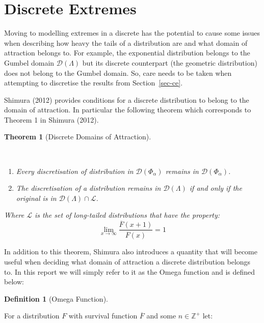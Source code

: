 \documentclass[
  10pt,
  a4paper,
]{scrreprt}
\providecommand{\tightlist}{%
  \setlength{\itemsep}{0pt}\setlength{\parskip}{0pt}}\usepackage{longtable,booktabs,array}
\theoremstyle{plain}
\newtheorem{theorem}{Theorem}[section]
\theoremstyle{definition}
\newtheorem{definition}{Definition}[section]
\theoremstyle{remark}
\begin{document}
{\hypertarget{discrete-extremes}{%
\section{Discrete Extremes}\label{discrete-extremes}}

Moving to modelling extremes in a discrete has the potential to cause
some issues when describing how heavy the tails of a distribution are
and what domain of attraction belongs to. For example, the exponential
distribution belongs to the Gumbel domain \(\mathcal D(\Lambda)\) but
its discrete counterpart (the geometric distribution) does not belong to
the Gumbel domain. So, care needs to be taken when attempting to
discretise the results from Section~\ref{sec-ce}.

Shimura (2012) provides conditions for a discrete distribution to belong
to the domain of attraction. In particular the following theorem which
corresponds to Theorem 1 in Shimura (2012).

\begin{theorem}[Discrete Domains of
Attraction]\protect\hypertarget{thm-shimura1}{}\label{thm-shimura1}

~

\begin{enumerate}
\def\labelenumi{(\alph{enumi})}
\tightlist
\item
  Every discretisation of distribution in \(\mathcal D(\Phi_\alpha)\)
  remains in \(\mathcal D(\Phi_\alpha)\).
\item
  The discretisation of a distribution remains in
  \(\mathcal D(\Lambda)\) if and only if the original is in
  \(\mathcal D(\Lambda)\cap \mathcal L\).
\end{enumerate}

Where \(\mathcal L\) is the set of long-tailed distributions that have
the property: \[
\lim_{x\rightarrow \infty}\frac{\overline F(x+1)}{\overline F(x)} = 1   
\]

\end{theorem}

In addition to this theorem, Shimura also introduces a quantity that
will become useful when deciding what domain of attraction a discrete
distribution belongs to. In this report we will simply refer to it as
the Omega function and is defined below:

\begin{definition}[Omega
Function]\protect\hypertarget{def-omega}{}\label{def-omega}

For a distribution \(F\) with survival function \(\overline F\) and some
\(n\in\mathbb Z^+\) let:


\end{definition}}
\end{document}
